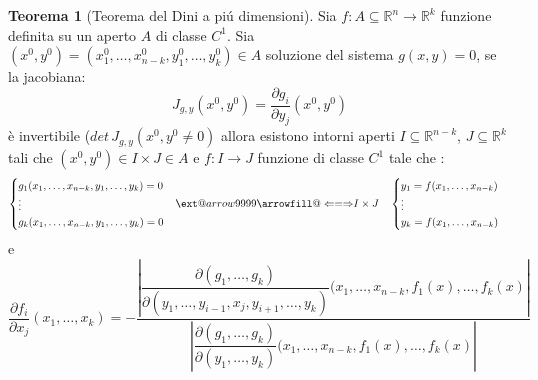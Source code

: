 \documentclass[leqno]{article}
\makeatletter
\newcommand\xLeftrightarrow[2][]{%
	\ext@arrow 9999{\Longleftrightarrowfill@}{#1}{#2}}
\newcommand\Longleftrightarrowfill@{%
	\arrowfill@\Leftarrow\Relbar\Rightarrow}
\theoremstyle{definition}
\numberwithin{equation}{section}
\newtheorem{theorem}{Teorema}[section]
\theoremstyle{remark}
\makeatother
\begin{document}
	\begin{theorem}[Teorema del Dini a piú dimensioni]
		Sia $f:A\subseteq \mathbb{R}^n \rightarrow \mathbb{R}^k$ funzione definita su un aperto $A$ di classe $C^1$. Sia $(x^0,y^0)=(x_1^0,\dots,x_{n-k}^0,y_1^0,\dots,y_k^0)\in A$ soluzione del sistema $g(x,y)=0$, se la jacobiana:
		\begin{equation}
			J_{g,y}(x^0,y^0)=\dfrac{\partial g_i}{\partial y_j}(x^0,y^0)
		\end{equation}
		è invertibile ($det \, J_{g,y}(x^0,y^0\neq 0)$ allora esistono intorni aperti $I\subseteq \mathbb{R}^{n-k}$, $J\subseteq \mathbb{R}^k$ tali che $(x^0,y^0)\in I \times J \in A$ e $f: I \rightarrow J$ funzione di classe $C^1$ tale che : 
		\begin{equation}
			\begin{split}
				\begin{cases}
					g_1(x_1,\dots,x_{n-k},y_1,\dots,y_k)=0\\
					\vdots \\
					g_k(x_1,\dots,x_{n-k},y_1,\dots,y_k)=0
				\end{cases}
			\end{split}
			\begin{split}
				\xLeftrightarrow{\text{$I \times J$}} \quad 
				\begin{cases}
					y_1=f(x_1,\dots,x_{n-k})\\
					\vdots \\
					y_k=f(x_1,\dots,x_{n-k})
				\end{cases}
			\end{split}
		\end{equation}
		e 
		\begin{equation}
			\dfrac{\partial f_i}{\partial x_j}(x_1,\dots,x_k)=-\dfrac{\left|{\dfrac{\partial(g_1,\dots,g_k)}{\partial(y_1,\dots,y_{i-1},x_j,y_{i+1},\dots,y_k)}(x_1,\dots ,x_{n-k},f_1(x),\dots,f_k(x)}\right|}{\left|{\dfrac{\partial(g_1,\dots,g_k)}{\partial(y_1,\dots,y_k)}(x_1,\dots ,x_{n-k},f_1(x),\dots,f_k(x)}\right|}
		\end{equation}
	\end{theorem}
	
\end{document}

